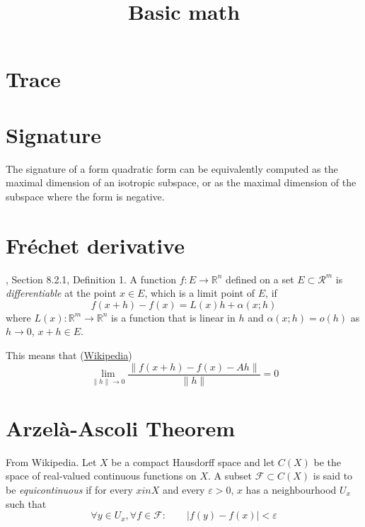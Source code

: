 



\title{Basic math}
\maketitle

\label{section-phantom}

\tableofcontents

\section{Trace}
\label{section-trace}

\begin{proposition}
\label{proposition-trace-is-coordinate-independent}

\end{proposition}

\section{Signature}
\label{section-signature}

The signature of a form quadratic form can be equivalently computed as the
maximal dimension of an isotropic subspace, or as the maximal dimension of the
subspace where the form is negative.

\section{Fréchet derivative}
\label{section-Fréchet-derivative}

\begin{definition}
\label{definition-Frechet-derivative}
\cite{zo1}, Section 8.2.1, Definition 1. A function $f:E \to \mathbb{R}^n$
defined on a set $E \subset \mathcal{R}^m$ is {\it differentiable} at the point
$x \in E$, which is a limit point of $E$, if
$$
f(x+h)-f(x)=L(x)h+\alpha(x;h)
$$
where $L(x):\mathbb{R}^m\to \mathbb{R}^n$ is a function that is linear in $h$
and $\alpha(x;h)=o(h)$ as $h\to 0$, $x+h\in E$.
\end{definition}

This means that (\href{Alguém sabe um jeito bom de mostrar A~(1\s) * Id
?}{Wikipedia})
$$
\lim_{\|h\|\to 0} \frac{\|f(x+h)-f(x)-Ah\|}{\|h\|}=0
$$

\section{Arzelà-Ascoli Theorem}
\label{section-Arzela-Ascoli-theorem}
\begin{definition}
\label{definition-equicontinuous}
From Wikipedia. Let $X$ be a compact Hausdorff space and let  $C(X)$ be the
space of real-valued continuous functions on $X$. A subset $\mathcal{F} \subset
C(X)$ is said to be {\it equicontinuous} if for every $x in X$ and every
$\varepsilon>0$, $x$ has a neighbourhood $U_x$ such that
$$
\forall y \in U_x, \forall f \in \mathcal{F}: \qquad |f(y)-f(x)|<\varepsilon
$$
\end{definition}


